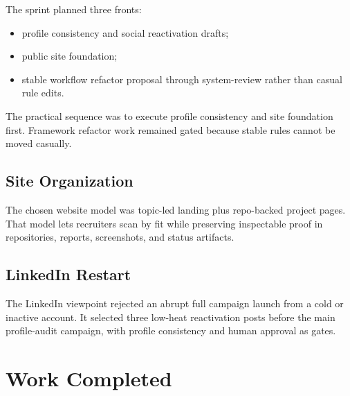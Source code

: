 \documentclass[a4paper,11pt,openany]{report}
\begin{document}
The sprint planned three fronts:

\begin{itemize}
  \item profile consistency and social reactivation drafts;
  \item public site foundation;
  \item stable workflow refactor proposal through system-review rather than
    casual rule edits.
\end{itemize}

The practical sequence was to execute profile consistency and site foundation
first. Framework refactor work remained gated because stable rules cannot be
moved casually.

\section{Site Organization}

The chosen website model was topic-led landing plus repo-backed project pages.
That model lets recruiters scan by fit while preserving inspectable proof in
repositories, reports, screenshots, and status artifacts.

\section{LinkedIn Restart}

The LinkedIn viewpoint rejected an abrupt full campaign launch from a cold or
inactive account. It selected three low-heat reactivation posts before the main
profile-audit campaign, with profile consistency and human approval as gates.

\chapter{Work Completed}
\end{document}
